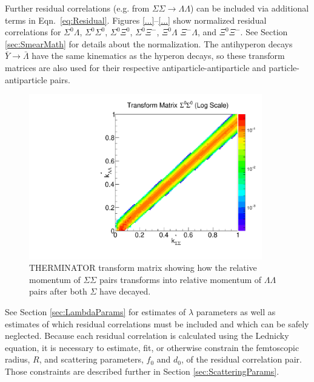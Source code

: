 Further residual correlations (e.g. from $\Sigma\Sigma \rightarrow \Lambda\Lambda$) can be included via additional terms in Eqn.\ \ref{eq:Residual}.  
Figures \ref{...}--\ref{...} show normalized residual correlations for $\Sigma^0\Lambda$, $\Sigma^0\Sigma^0$, $\Sigma^0\Xi^{0}$, $\Sigma^0\Xi^{-}$, $\Xi^0\Lambda$ $\Xi^{-}\Lambda$, and $\Xi^0\Xi^{-}$. See Section \ref{sec:SmearMath} for details about the normalization.
The antihyperon decays $\bar{Y} \rightarrow \bar{\Lambda}$ have the same kinematics as the hyperon decays, so these transform matrices are also used for their respective antiparticle-antiparticle and particle-antiparticle pairs.

\begin{figure}[hbtp]
\begin{center}
\includegraphics[width=24pc]{Figures/TransformMatrices/2016-7-20-TransformMatrixSigmaSigmaNormLog.pdf}
\end{center}
\caption[Transform matrix for $k^*_{\Sigma^0\Sigma^0} \rightarrow k^*_{\Lambda\Lambda}$]{THERMINATOR \cite{Chojnacki:2011hb} transform matrix showing how the relative momentum of $\Sigma\Sigma$ pairs transforms into relative momentum of $\Lambda\Lambda$ pairs after both $\Sigma$ have decayed.}
\label{fig:TherminatorSS}
\end{figure}


See Section \ref{sec:LambdaParams} for estimates of $\lambda$ parameters as well as estimates of which residual correlations must be included and which can be safely neglected.  
Because each residual correlation is calculated using the Lednicky equation, it is necessary to estimate, fit, or otherwise constrain the femtoscopic radius, $R$, and scattering parameters, $f_0$ and $d_0$, of the residual correlation pair.
Those constraints are described further in Section \ref{sec:ScatteringParams}.

